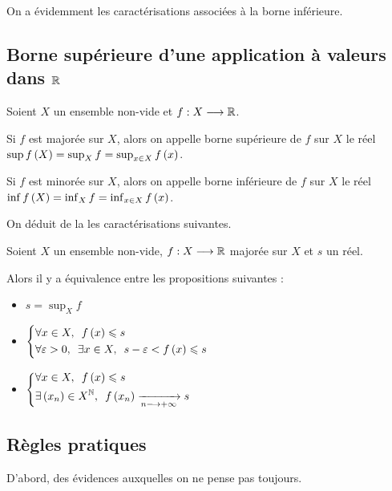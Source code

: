 On a évidemment les caractérisations associées à la borne inférieure.

\subsection{Borne supérieure d'une application à valeurs dans \(\mathbb{R}\)}

\begin{defi}
Soient \(X\) un ensemble non-vide et \(f:X\longrightarrow\mathbb{R}\).

Si \(f\) est majorée sur \(X\), alors on appelle borne supérieure de \(f\) sur \(X\) le réel \(\sup f\left(X\right)=\sup_Xf=\sup_{x\in X}f\left(x\right)\).

Si \(f\) est minorée sur \(X\), alors on appelle borne inférieure de \(f\) sur \(X\) le réel \(\inf f\left(X\right)=\inf_Xf=\inf_{x\in X}f\left(x\right)\).
\end{defi}

On déduit de la  les caractérisations suivantes.

\begin{prop}
Soient \(X\) un ensemble non-vide, \(f:X\longrightarrow\mathbb{R}\) majorée sur \(X\) et \(s\) un réel.

Alors il y a équivalence entre les propositions suivantes :

\begin{itemize}
    \item \(s=\sup_Xf\) \\
    \item \(\begin{dcases}\quantifs{\forall x\in X}f\paren{x}\leq s \\ \quantifs{\forall\epsilon>0;\exists x\in X}s-\epsilon<f\paren{x}\leq s\end{dcases}\) \\
    \item \(\begin{dcases}\quantifs{\forall x\in X}f\paren{x}\leq s \\ \quantifs{\exists\paren{x_n}\in X^\N}f\paren{x_n}\tendqd{n\to\pinf}s\end{dcases}\)
\end{itemize}
\end{prop}

\subsection{Règles pratiques}

D'abord, des évidences auxquelles on ne pense pas toujours.

